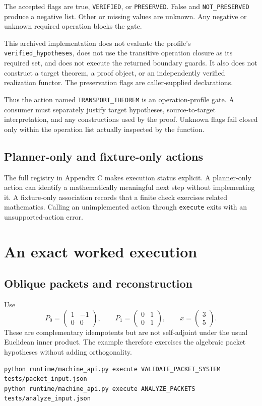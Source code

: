\documentclass[a4paper,11pt]{article}
\begin{document}
The accepted flags are true, \nolinkurl{VERIFIED}, or \nolinkurl{PRESERVED}. False and \nolinkurl{NOT_PRESERVED} produce a negative list. Other or missing values are unknown. Any negative or unknown required operation blocks the gate.

This archived implementation does not evaluate the profile's \nolinkurl{verified_hypotheses}, does not use the transitive operation closure as its required set, and does not execute the returned boundary guards. It also does not construct a target theorem, a proof object, or an independently verified realization functor. The preservation flags are caller-supplied declarations.

Thus the action named \nolinkurl{TRANSPORT_THEOREM} is an operation-profile gate. A consumer must separately justify target hypotheses, source-to-target interpretation, and any constructions used by the proof. Unknown flags fail closed only within the operation list actually inspected by the function.
\subsection{Planner-only and fixture-only actions}
The full registry in Appendix C makes execution status explicit. A planner-only action can identify a mathematically meaningful next step without implementing it. A fixture-only association records that a finite check exercises related mathematics. Calling an unimplemented action through \nolinkurl{execute} exits with an unsupported-action error.

\section{An exact worked execution}
\subsection{Oblique packets and reconstruction}
Use
\[
P_0=\begin{pmatrix}1&-1\\0&0\end{pmatrix},\qquad
P_1=\begin{pmatrix}0&1\\0&1\end{pmatrix},\qquad
x=\begin{pmatrix}3\\5\end{pmatrix}.
\]
These are complementary idempotents but are not self-adjoint under the usual Euclidean inner product. The example therefore exercises the algebraic packet hypotheses without adding orthogonality.
\begin{lstlisting}
python runtime/machine_api.py execute VALIDATE_PACKET_SYSTEM tests/packet_input.json
python runtime/machine_api.py execute ANALYZE_PACKETS tests/analyze_input.json
\end{lstlisting}
\end{document}
